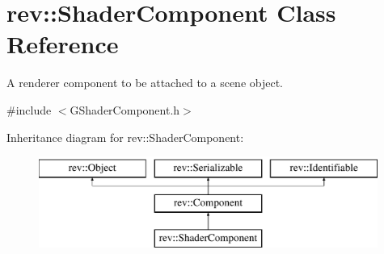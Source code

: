 \hypertarget{classrev_1_1_shader_component}{}\section{rev\+::Shader\+Component Class Reference}
\label{classrev_1_1_shader_component}


A renderer component to be attached to a scene object.  




{\ttfamily \#include $<$G\+Shader\+Component.\+h$>$}

Inheritance diagram for rev\+::Shader\+Component\+:\begin{figure}[H]
\begin{center}
\leavevmode
\includegraphics[height=3.000000cm]{classrev_1_1_shader_component}
\end{center}
\end{figure}
